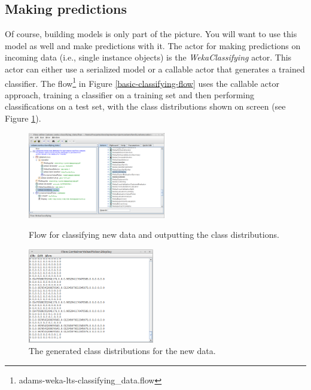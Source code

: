 \clearpage
\subsection{Making predictions}
Of course, building models is only part of the picture. You will want to use
this model as well and make predictions with it. The actor for making
predictions on incoming data (i.e., single instance objects) is the
\textit{WekaClassifying} actor. This actor can either use a serialized model or
a callable actor that generates a trained classifier. The
flow\footnote{adams-weka-lts-classifying\_data.flow} in Figure
\ref{basic-classifying-flow} uses the callable actor approach, training a
classifier on a training set and then performing classifications on a test set,
with the class distributions shown on screen (see Figure
\ref{basic-classifying-output}).

\begin{figure}[ht]
  \begin{minipage}[t]{0.5\linewidth}
    \centering
    \includegraphics[width=6.0cm]{images/basic-classifying-flow.png}
    \caption{Flow for classifying new data and outputting the class
    distributions.}
    \label{basic-classifying-flow}
  \end{minipage}
  \hspace{0.5cm}
  \begin{minipage}[t]{0.5\linewidth}
    \centering
    \includegraphics[width=5.5cm]{images/basic-classifying-output.png}
    \caption{The generated class distributions for the new data.}
    \label{basic-classifying-output}
  \end{minipage}
\end{figure}

